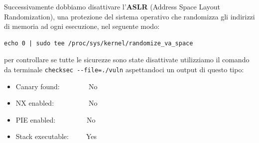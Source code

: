 \documentclass[main.tex]{subfiles}
\begin{document}
\noindent Successivamente dobbiamo disattivare l'\textbf{ASLR} (Address Space Layout Randomization),  una protezione del sistema operativo che randomizza gli indirizzi di memoria ad ogni esecuzione, nel seguente modo:
\begin{verbatim}
echo 0 | sudo tee /proc/sys/kernel/randomize_va_space
\end{verbatim}
per controllare se tutte le sicurezze sono state disattivate utilizziamo il comando da terminale \verb|checksec --file=./vuln| aspettandoci un output di questo tipo:

\begin{itemize}
    \item Canary found:          No
    \item NX enabled:            No
    \item PIE enabled:           No
    \item Stack executable:      Yes
\end{itemize}
\end{document}
